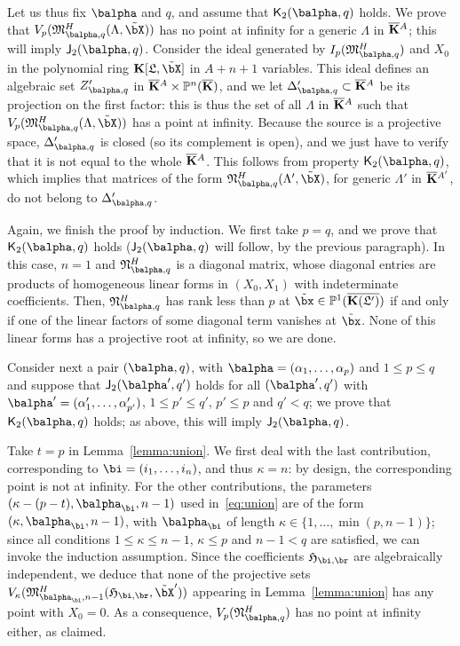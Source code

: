 \documentclass[12pt]{article}
\begin{document}
Let us thus fix $\balpha$ and $q$, and assume that
$\assJ_2(\balpha,q)$ holds. We prove that
$V_p(\mathfrak{M}^H_{\balpha,q}(\Lambda,\tilde\bX))$ has no point at
infinity for a generic $\Lambda$ in $\overline{\mathbf{K}}{}^A$; this will imply
$\assI_2(\balpha,q)$. Consider the ideal generated by
$I_{p}(\mathfrak{M}^H_{\balpha,q})$ and $X_0$ in the polynomial ring
$\KK[\mathfrak{L},\tilde\bX]$ in $A+n+1$ variables. This ideal defines
an algebraic set $Z'_{\balpha,q}$ in $\overline{\mathbf{K}}{}^A \times \mathbb{P}^n(\overline{\mathbf{K}})$,
and we let $\Delta'_{\balpha,q} \subset \KKbar{}^A$ be its projection
on the first factor: this is thus the set of all $\Lambda$ in
$\overline{\mathbf{K}}{}^A$ such that
$V_p(\mathfrak{M}^H_{\balpha,q}(\Lambda,\tilde\bX))$ has a point at
infinity. Because the source is a projective space, $\Delta'_{\balpha,q}$ is
closed (so its complement is open), and we just have to verify that it
is not equal to the whole $\overline{\mathbf{K}}{}^A$. This follows from property
$\assJ_2(\balpha,q)$, which implies that matrices of the form
$\mathfrak{N}^H_{\balpha,q}(\Lambda',\tilde\bX)$, for generic
$\Lambda'$ in $\overline{\mathbf{K}}{}^{A'}$, do not belong to $\Delta'_{\balpha,q}$.

Again, we finish the proof by induction. We first take $p=q$, and we
prove that $\assJ_2(\balpha,q)$ holds ($\assI_2(\balpha,q)$ will follow,
by the previous paragraph). In this case, $n=1$ and
$\mathfrak{N}^H_{\balpha,q}$ is a diagonal matrix, whose diagonal entries
are products of homogeneous linear forms in $(X_0,X_1)$ with indeterminate
coefficients. Then, $\mathfrak{N}^H_{\balpha,q}$ has rank less than $p$ at
$\tilde\bx\in\P^1(\KKGpbar)$ if and only if one of the linear factors
of some diagonal term vanishes at $\tilde \bx$. None of this linear
forms has a projective root at infinity, so we are done.

Consider next a pair $(\balpha,q)$, with
$\balpha=(\alpha_1,\dots,\alpha_p)$ and $1 \le p \le q$ and suppose
that $\assI_2(\balpha',q')$ holds for all $(\balpha',q')$ with
$\balpha'=(\alpha'_1,\dots,\alpha'_{p'})$, $1 \le p' \le q'$, $p' \le p$ and $q'
< q$; we prove that $\assJ_2(\balpha,q)$ holds; as above, this will
imply $\assI_2(\balpha,q)$.

Take $t=p$ in Lemma~\ref{lemma:union}. We first deal with the last
contribution, corresponding to $\bi=(i_1,\dots,i_n)$, and thus
$\kappa=n$: by design, the corresponding point is not at infinity. For
the other contributions, the parameters $(\kappa-(p-t),\balpha_\bi,n-1)$
used in~\eqref{eq:union} are of the form $(\kappa,\balpha_\bi,n-1)$, with
$\balpha_\bi$ of length $\kappa \in \{1,\dots, \min(p,n-1)\}$; since all
conditions $1 \le \kappa \le n-1$, $\kappa \le p$ and $n-1 < q$ are satisfied,
we can invoke the induction assumption. Since the coefficients
$\mathfrak{H}_{\bi,\br}$ are algebraically independent, we deduce that
none of the projective sets
$V_\kappa(\mathfrak{M}^H_{\balpha_\bi,n-1}(\mathfrak{H}_{\bi,\br},\tilde\bX'))$ appearing in
Lemma~\ref{lemma:union} has any point with $X_0=0$. As a consequence,
$V_p(\mathfrak{N}^H_{\balpha,q})$ has no point at infinity either, as
claimed.
\end{document}
